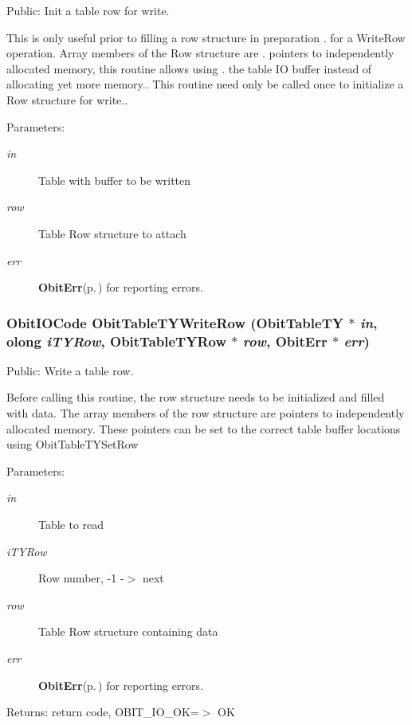 Public: Init a table row for write. 

This is only useful prior to filling a row structure in preparation . for a Write\-Row operation. Array members of the Row structure are . pointers to independently allocated memory, this routine allows using . the table IO buffer instead of allocating yet more memory.. This routine need only be called once to initialize a Row structure for write.. \begin{Desc}
\item[Parameters:]
\begin{description}
\item[{\em in}]Table with buffer to be written \item[{\em row}]Table Row structure to attach \item[{\em err}]{\bf Obit\-Err}{\rm (p.\,\pageref{structObitErr})} for reporting errors. \end{description}
\end{Desc}
\subsubsection{\setlength{\rightskip}{0pt plus 5cm}Obit\-IOCode Obit\-Table\-TYWrite\-Row ({\bf Obit\-Table\-TY} $\ast$ {\em in}, {\bf olong} {\em i\-TYRow}, {\bf Obit\-Table\-TYRow} $\ast$ {\em row}, {\bf Obit\-Err} $\ast$ {\em err})}\label{ObitTableTY_8h_a20}


Public: Write a table row. 

Before calling this routine, the row structure needs to be initialized and filled with data. The array members of the row structure are pointers to independently allocated memory. These pointers can be set to the correct table buffer locations using Obit\-Table\-TYSet\-Row \begin{Desc}
\item[Parameters:]
\begin{description}
\item[{\em in}]Table to read \item[{\em i\-TYRow}]Row number, -1 -$>$ next \item[{\em row}]Table Row structure containing data \item[{\em err}]{\bf Obit\-Err}{\rm (p.\,\pageref{structObitErr})} for reporting errors. \end{description}
\end{Desc}
\begin{Desc}
\item[Returns:]return code, OBIT\_\-IO\_\-OK=$>$ OK \end{Desc}

